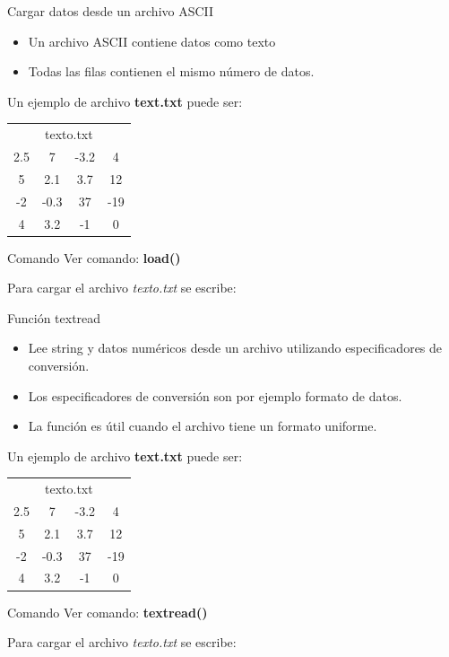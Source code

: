 \documentclass{bredelebeamer}
\begin{document}
\begin{frame}{Cargar datos desde un archivo ASCII}
\begin{itemize}
\item Un archivo ASCII contiene datos como texto
\item Todas las filas contienen el mismo número de datos.
\end{itemize}
Un ejemplo de archivo \textbf{text.txt} puede ser:
\begin{table}[]
\centering
\begin{tabular}{cccc}
\multicolumn{4}{c}{texto.txt} \\
2.5   & 7      & -3.2  & 4    \\
5     & 2.1    & 3.7   & 12   \\
-2    & -0.3   & 37    & -19  \\
4     & 3.2    & -1    & 0   
\end{tabular}
\end{table}
\begin{exampleblock}{Comando}
Ver comando: \textbf{load()}
\end{exampleblock}
Para cargar el archivo \textit{texto.txt} se escribe:\\
\end{frame}

\begin{frame}{Función textread}
\begin{itemize}
\item Lee string y datos numéricos desde un archivo utilizando especificadores de conversión.
\item Los especificadores de conversión son por ejemplo formato de datos.
\item La función es útil cuando el archivo tiene un formato uniforme.
\end{itemize}
Un ejemplo de archivo \textbf{text.txt} puede ser:
\begin{table}[]
\centering
\begin{tabular}{cccc}
\multicolumn{4}{c}{texto.txt} \\
2.5   & 7      & -3.2  & 4    \\
5     & 2.1    & 3.7   & 12   \\
-2    & -0.3   & 37    & -19  \\
4     & 3.2    & -1    & 0   
\end{tabular}
\end{table}
\begin{exampleblock}{Comando}
Ver comando: \textbf{textread()}
\end{exampleblock}
Para cargar el archivo \textit{texto.txt} se escribe:\\
\end{frame}
\end{document}
